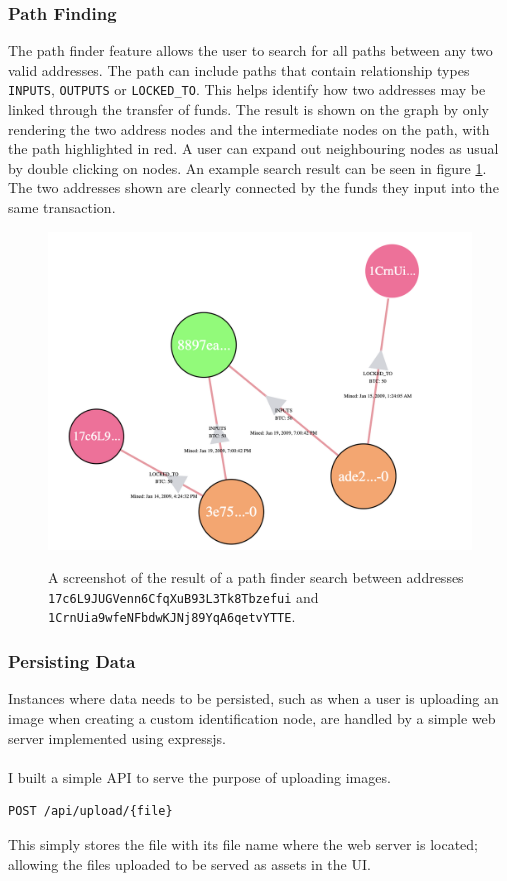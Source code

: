 \subsubsection{Path Finding}
The path finder feature allows the user to search for all paths between any two valid addresses. The path can include paths that contain relationship types \texttt{INPUTS}, \texttt{OUTPUTS} or \texttt{LOCKED\_TO}. This helps identify how two addresses may be linked through the transfer of funds. The result is shown on the graph by only rendering the two address nodes and the intermediate nodes on the path, with the path highlighted in red. A user can expand out neighbouring nodes as usual by double clicking on nodes. An example search result can be seen in figure \ref{fig:path-search-result}. The two addresses shown are clearly connected by the funds they input into the same transaction. 

\begin{figure}[h!]
  \centering
  \includegraphics[width = 15cm]{./figures/ui-screenshots/path-find-result}\\[0.5cm] 
  \caption{A screenshot of the result of a path finder search between addresses \texttt{17c6L9JUGVenn6CfqXuB93L3Tk8Tbzefui} and \texttt{1CrnUia9wfeNFbdwKJNj89YqA6qetvYTTE}.}
  \label{fig:path-search-result}
\end{figure}



\subsubsection{Persisting Data}
Instances where data needs to be persisted, such as when a user is uploading an image when creating a custom identification node, are handled by a simple web server implemented using expressjs. 
\\\\
I built a simple API to serve the purpose of uploading images.
\begin{lstlisting}
POST /api/upload/{file}
\end{lstlisting}
This simply stores the file with its file name where the web server is located; allowing the files uploaded to be served as assets in the UI. 